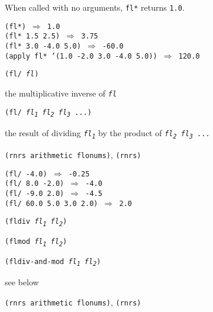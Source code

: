 When called with no arguments, \texttt{fl*} returns \texttt{1.0}.


\begin{alltt}
(fl*) \(\Rightarrow\) 1.0
(fl* 1.5 2.5) \(\Rightarrow\) 3.75
(fl* 3.0 -4.0 5.0) \(\Rightarrow\) -60.0
(apply fl* '(1.0 -2.0 3.0 -4.0 5.0)) \(\Rightarrow\) 120.0
\end{alltt}

\begin{description}

\label{objects_s187}\item[procedure] \texttt{(fl/ \textit{fl})}



\item[returns] the multiplicative inverse of \texttt{\textit{fl}}


\item[procedure] \texttt{(fl/ \textit{fl\textsubscript{1}} \textit{fl\textsubscript{2}} \textit{fl\textsubscript{3}} ...)}



\item[returns] the result of dividing \texttt{\textit{fl\textsubscript{1}}} by the product of \texttt{\textit{fl\textsubscript{2}} \textit{fl\textsubscript{3}} ...}


\item[libraries] \texttt{(rnrs arithmetic flonums)}, \texttt{(rnrs)}
\end{description}


\begin{alltt}
(fl/ -4.0) \(\Rightarrow\) -0.25
(fl/ 8.0 -2.0) \(\Rightarrow\) -4.0
(fl/ -9.0 2.0) \(\Rightarrow\) -4.5
(fl/ 60.0 5.0 3.0 2.0) \(\Rightarrow\) 2.0
\end{alltt}

\begin{description}

\label{objects_s188}\item[procedure] \texttt{(fldiv \textit{fl\textsubscript{1}} \textit{fl\textsubscript{2}})}



\item[procedure] \texttt{(flmod \textit{fl\textsubscript{1}} \textit{fl\textsubscript{2}})}



\item[procedure] \texttt{(fldiv-and-mod \textit{fl\textsubscript{1}} \textit{fl\textsubscript{2}})}



\item[returns] see below


\item[libraries] \texttt{(rnrs arithmetic flonums)}, \texttt{(rnrs)}
\end{description}



